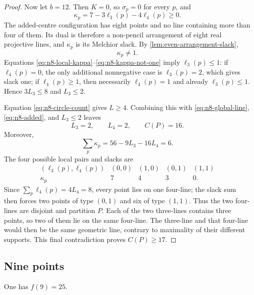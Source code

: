 \begin{proof}
Now let $b=12$.  Then $K=0$, so $\sigma_p=0$ for every $p$, and
\begin{equation}\label{eq:n8-local-kappa}
 \kappa_p=7-3\ell_3(p)-4\ell_4(p)\geq0.
\end{equation}
The added-centre configuration has eight points and no line containing more
than four of them.  Its dual is therefore a non-pencil arrangement of eight
real projective lines, and $\kappa_p$ is its Melchior slack.  By
\cref{lem:even-arrangement-slack},
\begin{equation}\label{eq:n8-kappa-not-one}
 \kappa_p\neq1.
\end{equation}
Equations \eqref{eq:n8-local-kappa}--\eqref{eq:n8-kappa-not-one} imply
$\ell_3(p)\leq1$: if $\ell_4(p)=0$, the only additional nonnegative case is
$\ell_3(p)=2$, which gives slack one; if $\ell_4(p)\geq1$, then necessarily
$\ell_4(p)=1$ and already $\ell_3(p)\leq1$.  Hence
$3L_3\leq8$ and $L_3\leq2$.

Equation \eqref{eq:n8-circle-count} gives $L\geq4$.  Combining this with
\eqref{eq:n8-global-line}, \eqref{eq:n8-added}, and $L_3\leq2$ leaves
\begin{equation}\label{eq:n8-final-line-row}
 L_3=2,\qquad L_4=2,\qquad C(P)=16.
\end{equation}
Moreover,
\[
 \sum_p\kappa_p=56-9L_3-16L_4=6.
\]
The four possible local pairs and slacks are
\[
\begin{array}{c|cccc}
(\ell_3(p),\ell_4(p))&(0,0)&(1,0)&(0,1)&(1,1)\\ \hline
\kappa_p&7&4&3&0.
\end{array}
\]
Since $\sum_p\ell_4(p)=4L_4=8$, every point lies on one four-line; the slack
sum then forces two points of type $(0,1)$ and six of type $(1,1)$.  Thus the
two four-lines are disjoint and partition $P$.  Each of the two three-lines
contains three points, so two of them lie on the same four-line.  The
three-line and that four-line would then be the same geometric line, contrary
to maximality of their different supports.  This final contradiction proves
$C(P)\geq17$.
\end{proof}

\subsection{Nine points}

\begin{proposition}\label{prop:n9}
One has \(f(9)=25\).
\end{proposition}

